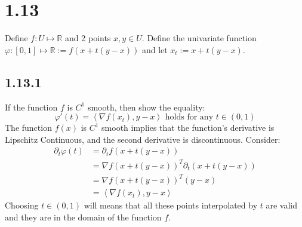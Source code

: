 \documentclass[]{article}
\begin{document}
\section*{1.13}
    Define $f:U\mapsto \mathbb{R}$ and 2 points $x, y \in U$. Define the univariate function $\varphi: [0, 1]\mapsto \mathbb{R}:= f(x + t(y - x))$ and let $x_t:= x + t(y - x)$. 
    \subsection*{1.13.1}
        If the function $f$ is $C^{1}$ smooth, then show the equality: 
        $$
            \varphi'(t) = \left\langle \nabla f(x_t), y - x \right\rangle \text{ holds for any } t \in (0, 1)
        $$
        The function $f(x)$ is $C^1$ smooth implies that the function's derivative is Lipschitz Continuous, and the second derivative is discontinuous. Consider: 
        \begin{align*}\tag{1.12.1.1}\label{eqn:1.12.1.1}
            \partial_t\varphi(t) &= \partial_t f(x + t(y - x))
            \\
            &= \nabla f(x + t(y - x))^T\partial_t(x + t(y - x))
            \\
            &=
            \nabla f(x + t(y - x))^T(y - x)
            \\
            &= 
            \left\langle \nabla f(x_t), y - x \right\rangle
        \end{align*}
        Choosing $t \in (0, 1)$ will means that all these points interpolated by $t$ are valid and they are in the domain of the function $f$. 
\end{document}

